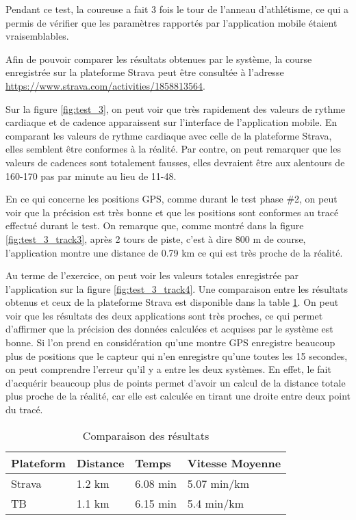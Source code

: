 Pendant ce test, la coureuse a fait 3 fois le tour de l'anneau d'athlétisme, ce qui a permis de vérifier que les paramètres rapportés par l'application mobile étaient vraisemblables.

Afin de pouvoir comparer les résultats obtenues par le système, la course enregistrée sur la plateforme Strava peut être consultée à l'adresse \url{https://www.strava.com/activities/1858813564}.

Sur la figure \ref{fig:test_3}, on peut voir que très rapidement des valeurs de rythme cardiaque et de cadence apparaissent sur l'interface de l'application mobile. En comparant les valeurs de rythme cardiaque avec celle de la plateforme Strava, elles semblent être conformes à la réalité. Par contre, on peut remarquer que les valeurs de cadences sont totalement fausses, elles devraient être aux alentours de 160-170 pas par minute au lieu de 11-48.

En ce qui concerne les positions GPS, comme durant le test phase \#2, on peut voir que la précision est très bonne et que les positions sont conformes au tracé effectué durant le test. On remarque que, comme montré dans la figure \ref{fig:test_3_track3}, après 2 tours de piste, c'est à dire 800 m de course, l'application montre une distance de 0.79 km ce qui est très proche de la réalité.

Au terme de l'exercice, on peut voir les valeurs totales enregistrée par l'application sur la figure \ref{fig:test_3_track4}. Une comparaison entre les résultats obtenus et ceux de la plateforme Strava est disponible dans la table \ref{tab:comp_results}. On peut voir que les résultats des deux applications sont très proches, ce qui permet d’affirmer que la précision des données calculées et acquises par le système est bonne. Si l’on prend en considération qu'une montre GPS enregistre beaucoup plus de positions que le capteur qui n'en enregistre qu'une toutes les 15 secondes, on peut comprendre l'erreur qu'il y a entre les deux systèmes. En effet, le fait d'acquérir beaucoup plus de points permet d'avoir un calcul de la distance totale plus proche de la réalité, car elle est calculée en tirant une droite entre deux point du tracé.

\begin{table}[htb]
\caption{Comparaison des résultats}
\label{tab:comp_results}
\centering
\begin{tabular}{ l l l l }
\toprule
Plateform & Distance & Temps & Vitesse Moyenne  \\
\midrule
Strava & 1.2 km & 6.08 min & 5.07 min/km \\
TB & 1.1 km & 6.15 min & 5.4 min/km \\
\bottomrule 
\end{tabular}
\end{table}

